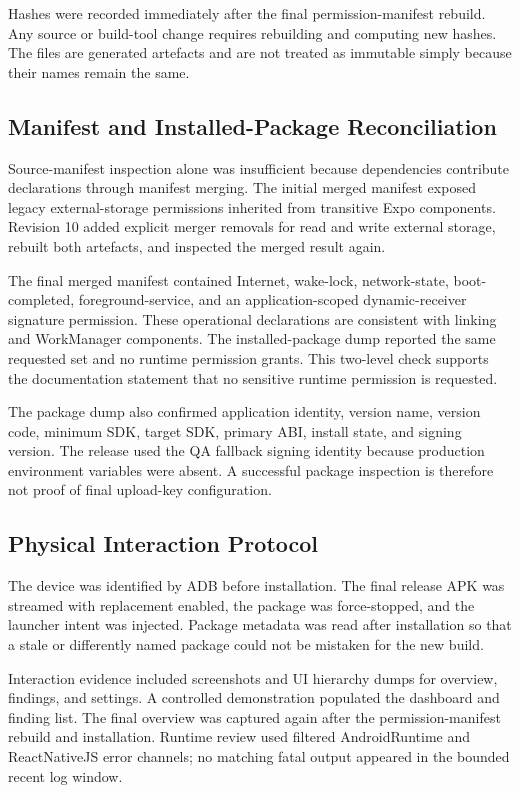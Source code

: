 Hashes were recorded immediately after the final permission-manifest rebuild. Any source or build-tool change requires rebuilding and computing new hashes. The files are generated artefacts and are not treated as immutable simply because their names remain the same.

\subsection{Manifest and Installed-Package Reconciliation}

Source-manifest inspection alone was insufficient because dependencies contribute declarations through manifest merging. The initial merged manifest exposed legacy external-storage permissions inherited from transitive Expo components. Revision 10 added explicit merger removals for read and write external storage, rebuilt both artefacts, and inspected the merged result again.

The final merged manifest contained Internet, wake-lock, network-state, boot-completed, foreground-service, and an application-scoped dynamic-receiver signature permission. These operational declarations are consistent with linking and WorkManager components. The installed-package dump reported the same requested set and no runtime permission grants. This two-level check supports the documentation statement that no sensitive runtime permission is requested.

The package dump also confirmed application identity, version name, version code, minimum SDK, target SDK, primary ABI, install state, and signing version. The release used the QA fallback signing identity because production environment variables were absent. A successful package inspection is therefore not proof of final upload-key configuration.

\subsection{Physical Interaction Protocol}

The device was identified by ADB before installation. The final release APK was streamed with replacement enabled, the package was force-stopped, and the launcher intent was injected. Package metadata was read after installation so that a stale or differently named package could not be mistaken for the new build.

Interaction evidence included screenshots and UI hierarchy dumps for overview, findings, and settings. A controlled demonstration populated the dashboard and finding list. The final overview was captured again after the permission-manifest rebuild and installation. Runtime review used filtered AndroidRuntime and ReactNativeJS error channels; no matching fatal output appeared in the bounded recent log window.

